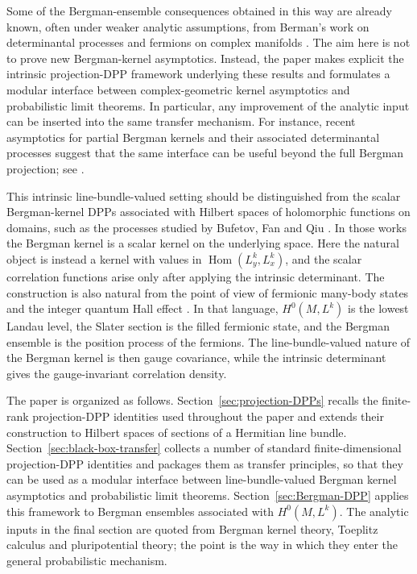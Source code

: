 \documentclass[12pt,a4paper,reqno]{article}
\theoremstyle{thmstyleone}
\theoremstyle{thmstylethree}
\theoremstyle{thmstyletwo}
\numberwithin{equation}{subsection}
\begin{document}
Some of the Bergman-ensemble consequences obtained in this way are already known, often under weaker analytic assumptions, from Berman's work on determinantal processes and fermions on complex manifolds \cite{Ber6,Ber7}. The aim here is not to prove new Bergman-kernel asymptotics. Instead, the paper makes explicit the intrinsic projection-DPP framework underlying these results and formulates a modular interface between complex-geometric kernel asymptotics and probabilistic limit theorems. In particular, any improvement of the analytic input can be inserted into the same transfer mechanism. For instance, recent asymptotics for partial Bergman kernels and their associated determinantal processes suggest that the same interface can be useful beyond the full Bergman projection; see \cite{Ioo25}.

This intrinsic line-bundle-valued setting should be distinguished from the scalar Bergman-kernel DPPs associated with Hilbert spaces of holomorphic functions on domains, such as the processes studied by Bufetov, Fan and Qiu \cite{BQ,BFQ,Buf23}.  In those works the Bergman kernel is a scalar kernel on the underlying space.  Here the natural object is instead a kernel with values in $\operatorname{Hom}(L_y^k,L_x^k)$, and the scalar correlation functions arise only after applying the intrinsic determinant. The construction is also natural from the point of view of fermionic many-body states and the integer quantum Hall effect \cite{DK,Kle,Kle2}.  In that language, $H^0(M,L^k)$ is the lowest Landau level, the Slater section is the filled fermionic state, and the Bergman ensemble is the position process of the fermions.  The line-bundle-valued nature of the Bergman kernel is then gauge covariance, while the intrinsic determinant gives the gauge-invariant correlation density.

The paper is organized as follows.  Section~\ref{sec:projection-DPPs} recalls the finite-rank projection-DPP identities used throughout the paper and extends their construction to Hilbert spaces of sections of a Hermitian line bundle. Section~\ref{sec:black-box-transfer} collects a number of standard finite-dimensional projection-DPP identities and packages them as transfer principles, so that they can be used as a modular interface between line-bundle-valued Bergman kernel asymptotics and probabilistic limit theorems.  Section~\ref{sec:Bergman-DPP} applies this framework to Bergman ensembles associated with $H^0(M,L^k)$.  The analytic inputs in the final section are quoted from Bergman kernel theory, Toeplitz calculus and pluripotential theory; the point is the way in which they enter the general probabilistic mechanism.
\end{document}
